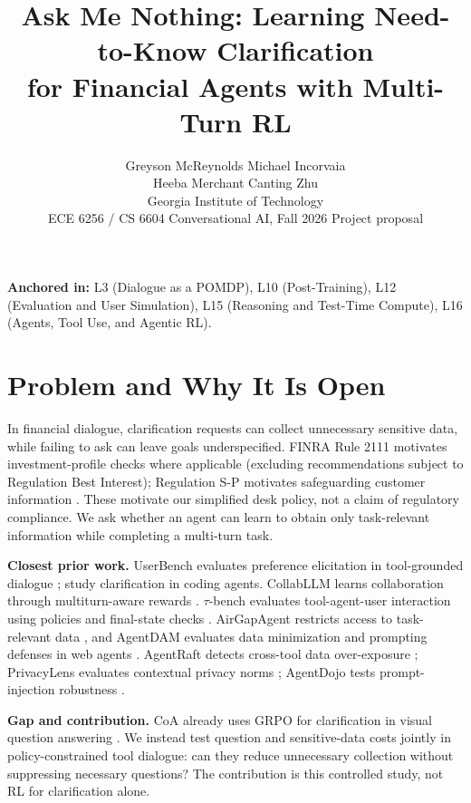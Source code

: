\documentclass[11pt]{article}
\title{Ask Me Nothing: Learning Need-to-Know Clarification \\ for Financial Agents with Multi-Turn RL}
\author{Greyson McReynolds \quad Michael Incorvaia \\ Heeba Merchant \quad Canting Zhu \\
  Georgia Institute of Technology \\
  ECE 6256 / CS 6604 Conversational AI, Fall 2026 \quad Project proposal}
\begin{document}
\maketitle

\noindent\textbf{Anchored in:} L3 (Dialogue as a POMDP), L10 (Post-Training), L12 (Evaluation and User Simulation), L15 (Reasoning and Test-Time Compute), L16 (Agents, Tool Use, and Agentic RL).

\section{Problem and Why It Is Open}

In financial dialogue, clarification requests can collect unnecessary sensitive data, while failing to ask can leave goals underspecified. FINRA Rule 2111 motivates investment-profile checks where applicable (excluding recommendations subject to Regulation Best Interest); Regulation S-P motivates safeguarding customer information \citep{finra-2111,finra-2024-regsp}. These motivate our simplified desk policy, not a claim of regulatory compliance. We ask whether an agent can learn to obtain only task-relevant information while completing a multi-turn task.

\textbf{Closest prior work.} UserBench evaluates preference elicitation in tool-grounded dialogue \citep{qian-2025-userbench}; \citet{edwards-2026-askorassume} study clarification in coding agents. CollabLLM learns collaboration through multiturn-aware rewards \citep{wu-2025-collabllm}. $\tau$-bench evaluates tool-agent-user interaction using policies and final-state checks \citep{yao-2025-taubench}. AirGapAgent restricts access to task-relevant data \citep{bagdasarian-2024-airgap}, and AgentDAM evaluates data minimization and prompting defenses in web agents \citep{zharmagambetov-2025-agentdam}. AgentRaft detects cross-tool data over-exposure \citep{lin-2026-agentraft}; PrivacyLens evaluates contextual privacy norms \citep{shao-2024-privacylens}; AgentDojo tests prompt-injection robustness \citep{debenedetti-2024-agentdojo}.

\textbf{Gap and contribution.} CoA already uses GRPO for clarification in visual question answering \citep{cao-2026-coa}. We instead test question and sensitive-data costs jointly in policy-constrained tool dialogue: can they reduce unnecessary collection without suppressing necessary questions? The contribution is this controlled study, not RL for clarification alone.
\end{document}
